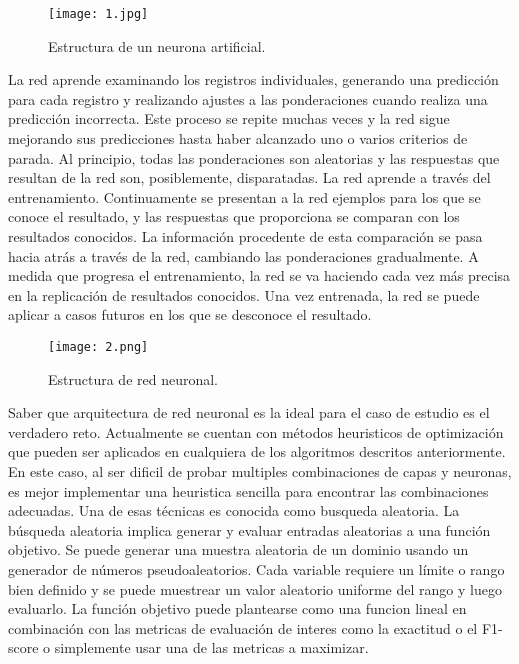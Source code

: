 \documentclass[conference]{IEEEtran}
\begin{document}
\begin{figure}[h]
    \centering
    \texttt{[image: 1.jpg]}
    \caption{Estructura de un neurona artificial.}
    \label{fig:mesh1}
\end{figure}

La red aprende examinando los registros individuales, generando una predicción para cada registro y realizando ajustes a las ponderaciones cuando realiza una predicción incorrecta. Este proceso se repite muchas veces y la red sigue mejorando sus predicciones hasta haber alcanzado uno o varios criterios de parada. Al principio, todas las ponderaciones son aleatorias y las respuestas que resultan de la red son, posiblemente, disparatadas. La red aprende a través del entrenamiento. Continuamente se presentan a la red ejemplos para los que se conoce el resultado, y las respuestas que proporciona se comparan con los resultados conocidos. La información procedente de esta comparación se pasa hacia atrás a través de la red, cambiando las ponderaciones gradualmente. A medida que progresa el entrenamiento, la red se va haciendo cada vez más precisa en la replicación de resultados conocidos. Una vez entrenada, la red se puede aplicar a casos futuros en los que se desconoce el resultado.

\begin{figure}[h]
    \centering
    \texttt{[image: 2.png]}
    \caption{Estructura de red neuronal.}
    \label{fig:mesh1}
\end{figure}

Saber que arquitectura de red neuronal es la ideal para el caso de estudio es el verdadero reto. Actualmente se cuentan con métodos heuristicos de optimización que pueden ser aplicados en cualquiera de los algoritmos descritos anteriormente. En este caso, al ser dificil de probar multiples combinaciones de capas y neuronas, es mejor implementar una heuristica sencilla para encontrar las combinaciones adecuadas. Una de esas técnicas es conocida como busqueda aleatoria. La búsqueda aleatoria implica generar y evaluar entradas aleatorias a una función objetivo. Se puede generar una muestra aleatoria de un dominio usando un generador de números pseudoaleatorios. Cada variable requiere un límite o rango bien definido y se puede muestrear un valor aleatorio uniforme del rango y luego evaluarlo. La función objetivo puede plantearse como una funcion lineal en combinación con las metricas de evaluación de interes como la exactitud o el F1-score o simplemente usar una de las metricas a maximizar. 
\end{document}

